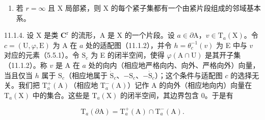 \begin{enumerate}
\def\labelenumi{\alph{enumi})}
\setcounter{enumi}{3}
\tightlist
\item
  若 \(r = \infty\) 且 X 局部紧，则 X 的每个紧子集都有一个由紧片段组成的邻域基本系。
\end{enumerate}

11.1.4. 设 X 是类 \(\mathbf{C}^{\mathrm{r}}\) 的流形，A 是 X 的一个片段。设 \(a \in \partial \mathrm{A}\)，\(v \in \mathrm{T}_a(\mathrm{X})\)。令 \(c = (\mathrm{U}, \varphi, \mathrm{E})\) 为 A 在 \(a\) 处的适配图（11.1.2），并令 \(h = \theta_c^{-1}(v)\) 为 E 中与 \(v\) 对应的元素（5.5.1）。令 \(\mathrm{S}_c\) 为 E 的闭半空间，使得 \(\varphi(\mathrm{A} \cap \mathrm{U})\) 是其开子集（11.1.2）。称 \(v\) 是 A 在 \(a\) 处的向内（相应地严格向内、向外、严格向外）向量，当且仅当 \(h\) 属于 \(\mathrm{S}_c\)（相应地属于 \(\dot{\mathrm{S}}_c\)、\(-\mathrm{S}_c\)、\(-\dot{\mathrm{S}}_c\)）；这个条件与适配图 \(c\) 的选择无关。我们把 \(\mathrm{T}_a^+(\mathrm{A})\)（相应地 \(\mathrm{T}_a^-(\mathrm{A})\)）记作 A 的向外（相应地向内）向量在 \(\mathrm{T}_a(\mathrm{X})\) 中的集合。这些是 \(\mathrm{T}_a(\mathrm{X})\) 的闭半空间，其边界包含 0。于是有

\[
\mathrm{T} _ {a} (\partial \mathrm{A}) = \mathrm{T} _ {a} ^ {+} (\mathrm{A}) \cap \mathrm{T} _ {a} ^ {-} (\mathrm{A}).
\]

